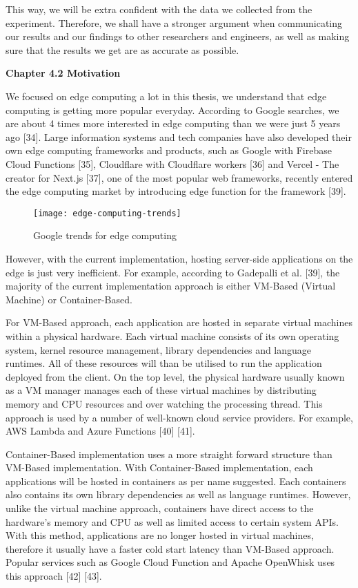This way, we will be extra confident with the data we collected from the experiment. Therefore, we shall have a stronger argument when communicating our results and our findings to other researchers and engineers, as well as making sure that the results we get are as accurate as possible.

\bigskip
\textbf{{\Large Chapter 4.2 Motivation}}

We focused on edge computing a lot in this thesis, we understand that edge computing is getting more popular everyday. According to Google searches, we are about 4 times more interested in edge computing than we were just 5 years ago [34]. Large information systems and tech companies have also developed their own edge computing frameworks and products, such as Google with Firebase Cloud Functions [35], Cloudflare with Cloudflare workers [36] and Vercel - The creator for Next.js [37], one of the most popular web frameworks, recently entered the edge computing market by introducing edge function for the framework [39].

\bigskip
\begin{figure}[hp]
\centering
\texttt{[image: edge-computing-trends]}
\caption{\footnotesize{Google trends for edge computing}}
\captionsetup{aboveskip=0pt,font=it}
\end{figure}
\bigskip

However, with the current implementation, hosting server-side applications on the edge is just very inefficient. For example, according to Gadepalli et al. [39], the majority of the current implementation approach is either VM-Based (Virtual Machine) or Container-Based.

For VM-Based approach, each application are hosted in separate virtual machines within a physical hardware. Each virtual machine consists of its own operating system, kernel resource management, library dependencies and language runtimes. All of these resources will than be utilised to run the application deployed from the client. On the top level, the physical hardware usually known as a VM manager manages each of these virtual machines by distributing memory and CPU resources and over watching the processing thread. This approach is used by a number of well-known cloud service providers. For example, AWS Lambda and Azure Functions [40] [41].

Container-Based implementation uses a more straight forward structure than VM-Based implementation. With Container-Based implementation, each applications will be hosted in containers as per name suggested. Each containers also contains its own library dependencies as well as language runtimes. However, unlike the virtual machine approach, containers have direct access to the hardware's memory and CPU as well as limited access to certain system APIs. With this method, applications are no longer hosted in virtual machines, therefore it usually have a faster cold start latency than VM-Based approach. Popular services such as Google Cloud Function and Apache OpenWhisk uses this approach [42] [43].

